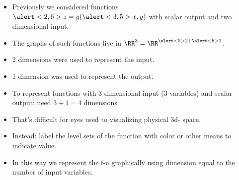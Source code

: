 \begin{frame}
\begin{itemize}
\item<1-> Previously we considered functions $\alert<2,6>{z}= g(\alert<3,5>{x,y})$  \alert<2>{with scalar output} and \alert<3>{two dimensional input}.
\item<4-> The graphs of such functions live in $\RR^3 = \RR^{\alert<5>{2} +\alert<6>{1}}$.
\item<5-> \alert<5>{2 dimensions} were used to represent the input.
\item<6-> \alert<6>{1 dimension} was used to represent the output.
\item<7-> To represent functions with 3 dimensional input (3 variables) and scalar output: need  $3+1=4$ dimensions.
\item<8-> That's difficult for eyes used to visualizing physical 3d- space.
\item<9-> Instead: label the level sets of the function with color or other means to indicate value.
\item<10-> In this way we represent the f-n graphically using dimension equal to the number of input variables.
\end{itemize}
\end{frame}
